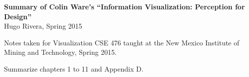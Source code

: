 \documentclass[letterpaper,10pt]{article}
\begin{document}
\begin{center}
\textbf{\huge
  Summary of Colin Ware's ``Information Visualization: Perception for Design''
}
\\
{\Large Hugo Rivera, Spring 2015}
\end{center}

Notes taken for Visualization CSE 476 taught at the New Mexico Institute of Mining and Technology, Spring 2015.

Summarize chapters 1 to 11 and Appendix D.

\dosecttoc
\setlength{\mtcindent}{0pt}
\setcounter{tocdepth}{1}

\begin{multicols}{2}
\tableofcontents
\end{multicols}

\def\stctitle{}

 
 
 
 
 
 
 
 
 
 
 
\begin{multicols}{2}

\end{multicols}

\end{document}
